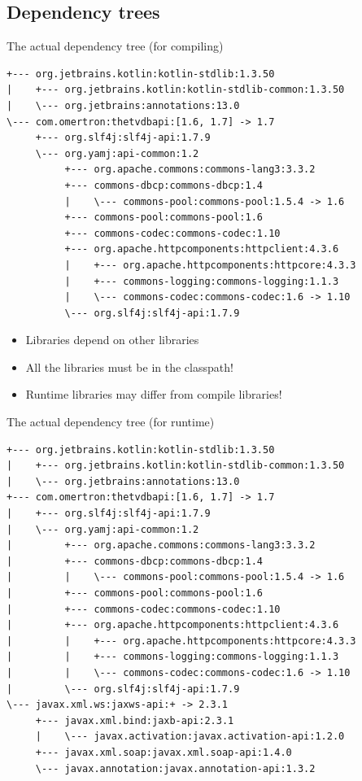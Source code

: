 \documentclass[presentation]{beamer}
\begin{document}
\subsection{Dependency trees}
\begin{frame}[fragile]{The actual dependency tree (for compiling)}
  \begin{block}{}
    \begin{verbatim}
+--- org.jetbrains.kotlin:kotlin-stdlib:1.3.50
|    +--- org.jetbrains.kotlin:kotlin-stdlib-common:1.3.50
|    \--- org.jetbrains:annotations:13.0
\--- com.omertron:thetvdbapi:[1.6, 1.7] -> 1.7
     +--- org.slf4j:slf4j-api:1.7.9
     \--- org.yamj:api-common:1.2
          +--- org.apache.commons:commons-lang3:3.3.2
          +--- commons-dbcp:commons-dbcp:1.4
          |    \--- commons-pool:commons-pool:1.5.4 -> 1.6
          +--- commons-pool:commons-pool:1.6
          +--- commons-codec:commons-codec:1.10
          +--- org.apache.httpcomponents:httpclient:4.3.6
          |    +--- org.apache.httpcomponents:httpcore:4.3.3
          |    +--- commons-logging:commons-logging:1.1.3
          |    \--- commons-codec:commons-codec:1.6 -> 1.10
          \--- org.slf4j:slf4j-api:1.7.9
    \end{verbatim}
  \end{block}
  \begin{itemize}
   \item Libraries depend on other libraries
   \item All the libraries must be in the classpath!
   \item Runtime libraries may differ from compile libraries!
  \end{itemize}
\end{frame}

\begin{frame}[fragile]{The actual dependency tree (for runtime)}
  \begin{block}{}
    \begin{verbatim}
+--- org.jetbrains.kotlin:kotlin-stdlib:1.3.50
|    +--- org.jetbrains.kotlin:kotlin-stdlib-common:1.3.50
|    \--- org.jetbrains:annotations:13.0
+--- com.omertron:thetvdbapi:[1.6, 1.7] -> 1.7
|    +--- org.slf4j:slf4j-api:1.7.9
|    \--- org.yamj:api-common:1.2
|         +--- org.apache.commons:commons-lang3:3.3.2
|         +--- commons-dbcp:commons-dbcp:1.4
|         |    \--- commons-pool:commons-pool:1.5.4 -> 1.6
|         +--- commons-pool:commons-pool:1.6
|         +--- commons-codec:commons-codec:1.10
|         +--- org.apache.httpcomponents:httpclient:4.3.6
|         |    +--- org.apache.httpcomponents:httpcore:4.3.3
|         |    +--- commons-logging:commons-logging:1.1.3
|         |    \--- commons-codec:commons-codec:1.6 -> 1.10
|         \--- org.slf4j:slf4j-api:1.7.9
\--- javax.xml.ws:jaxws-api:+ -> 2.3.1
     +--- javax.xml.bind:jaxb-api:2.3.1
     |    \--- javax.activation:javax.activation-api:1.2.0
     +--- javax.xml.soap:javax.xml.soap-api:1.4.0
     \--- javax.annotation:javax.annotation-api:1.3.2
    \end{verbatim}
  \end{block}
\end{frame}
\end{document}
